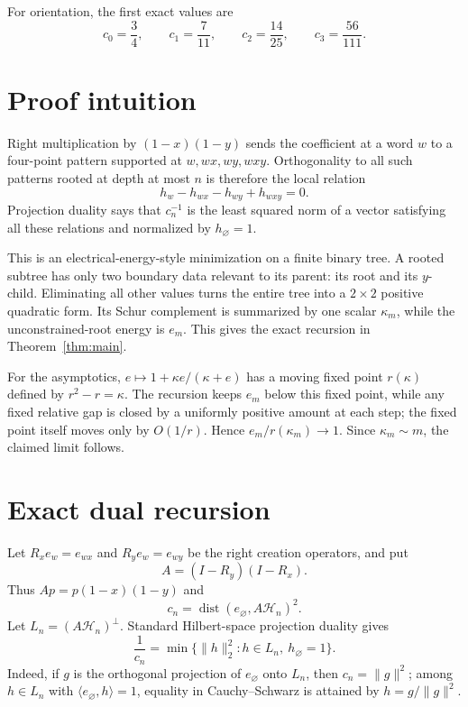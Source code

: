 \documentclass[11pt]{article}
\newcommand{\HH}{\mathcal H}
\newcommand{\emptyword}{\varnothing}
\begin{document}
For orientation, the first exact values are
\[
 c_0=\frac34,\qquad c_1=\frac7{11},\qquad
 c_2=\frac{14}{25},\qquad c_3=\frac{56}{111}.
\]

\section{Proof intuition}

Right multiplication by $(1-x)(1-y)$ sends the coefficient at a word $w$
to a four-point pattern supported at $w,wx,wy,wxy$.  Orthogonality to all
such patterns rooted at depth at most $n$ is therefore the local relation
\[
 h_w-h_{wx}-h_{wy}+h_{wxy}=0.
\]
Projection duality says that $c_n^{-1}$ is the least squared norm of a vector
satisfying all these relations and normalized by $h_{\emptyword}=1$.

This is an electrical-energy-style minimization on a finite binary tree.  A
rooted subtree has only two boundary data relevant to its parent: its root
and its $y$-child.  Eliminating all other values turns the entire tree into a
$2\times2$ positive quadratic form.  Its Schur complement is summarized by
one scalar $\kappa_m$, while the unconstrained-root energy is $e_m$.  This
gives the exact recursion in Theorem~\ref{thm:main}.

For the asymptotics, $e\mapsto1+\kappa e/(\kappa+e)$ has a moving fixed point
$r(\kappa)$ defined by $r^2-r=\kappa$.  The recursion keeps $e_m$ below this
fixed point, while any fixed relative gap is closed by a uniformly positive
amount at each step; the fixed point itself moves only by $O(1/r)$.  Hence
$e_m/r(\kappa_m)\to1$.  Since $\kappa_m\sim m$, the claimed limit follows.

\section{Exact dual recursion}

Let $R_xe_w=e_{wx}$ and $R_ye_w=e_{wy}$ be the right creation operators, and
put
\[
 A=(I-R_y)(I-R_x).
\]
Thus $Ap=p(1-x)(1-y)$ and
\[
 c_n=\operatorname{dist}(e_{\emptyword},A\HH_n)^2.
\]
Let $L_n=(A\HH_n)^\perp$.  Standard Hilbert-space projection duality gives
\begin{equation}\label{eq:dual}
 \frac1{c_n}
 =\min\{\|h\|_2^2:h\in L_n,\ h_{\emptyword}=1\}.
\end{equation}
Indeed, if $g$ is the orthogonal projection of $e_{\emptyword}$ onto $L_n$,
then $c_n=\|g\|^2$; among $h\in L_n$ with
$\langle e_{\emptyword},h\rangle=1$, equality in Cauchy--Schwarz is attained
by $h=g/\|g\|^2$.
\end{document}
